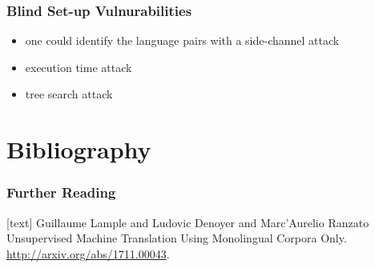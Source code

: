 \documentclass{beamer}
\begin{document}
\begin{frame}
\frametitle{Blind Set-up Vulnurabilities}

\begin{itemize}
\item one could identify the language pairs with a side-channel attack
\item execution time attack
\item tree search attack
\end{itemize}

\end{frame}

\section{Bibliography}

\begin{frame}[allowframebreaks]
\frametitle<presentation>{Further Reading}
\begin{thebibliography}{10}
\beamertemplatebookbibitems
{}[text]
{Guillaume Lample and Ludovic Denoyer and Marc'Aurelio Ranzato}
\newblock Unsupervised Machine Translation Using Monolingual Corpora Only.
\newblock \url{http://arxiv.org/abs/1711.00043}.
\end{thebibliography}
\end{frame}

\end{document}
